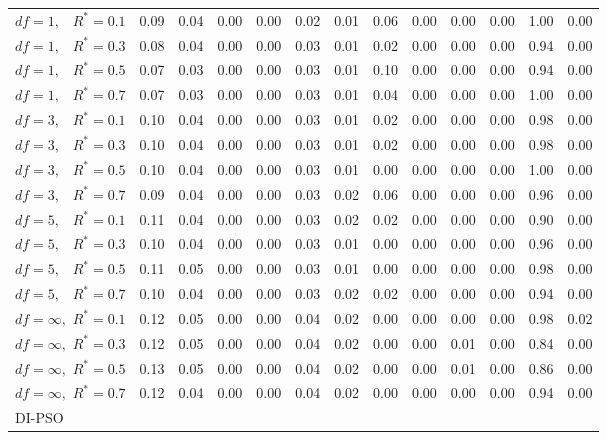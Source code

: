 \documentclass[12pt]{article}
\begin{document}
\begin{appendix}
\begin{table}[ht]
{\begin{tabular}{r|rrrr|rrrr|rrrr}
  $df = 1,\enspace$ $R^* =0.1$ & 0.09 & 0.04 & 0.00 & 0.00 & 0.02 & 0.01 & 0.06 & 0.00 & 0.00 & 0.00 & 1.00 & 0.00 \\ 
  $df = 1,\enspace$ $R^* =0.3$ & 0.08 & 0.04 & 0.00 & 0.00 & 0.03 & 0.01 & 0.02 & 0.00 & 0.00 & 0.00 & 0.94 & 0.00 \\ 
  $df = 1,\enspace$ $R^* =0.5$ & 0.07 & 0.03 & 0.00 & 0.00 & 0.03 & 0.01 & 0.10 & 0.00 & 0.00 & 0.00 & 0.94 & 0.00 \\ 
  $df = 1,\enspace$ $R^* =0.7$ & 0.07 & 0.03 & 0.00 & 0.00 & 0.03 & 0.01 & 0.04 & 0.00 & 0.00 & 0.00 & 1.00 & 0.00 \\ 
  $df = 3,\enspace$ $R^* =0.1$ & 0.10 & 0.04 & 0.00 & 0.00 & 0.03 & 0.01 & 0.02 & 0.00 & 0.00 & 0.00 & 0.98 & 0.00 \\ 
  $df = 3,\enspace$ $R^* =0.3$ & 0.10 & 0.04 & 0.00 & 0.00 & 0.03 & 0.01 & 0.02 & 0.00 & 0.00 & 0.00 & 0.98 & 0.00 \\ 
  $df = 3,\enspace$ $R^* =0.5$ & 0.10 & 0.04 & 0.00 & 0.00 & 0.03 & 0.01 & 0.00 & 0.00 & 0.00 & 0.00 & 1.00 & 0.00 \\ 
  $df = 3,\enspace$ $R^* =0.7$ & 0.09 & 0.04 & 0.00 & 0.00 & 0.03 & 0.02 & 0.06 & 0.00 & 0.00 & 0.00 & 0.96 & 0.00 \\ 
  $df = 5,\enspace$ $R^* =0.1$ & 0.11 & 0.04 & 0.00 & 0.00 & 0.03 & 0.02 & 0.02 & 0.00 & 0.00 & 0.00 & 0.90 & 0.00 \\ 
  $df = 5,\enspace$ $R^* =0.3$ & 0.10 & 0.04 & 0.00 & 0.00 & 0.03 & 0.01 & 0.00 & 0.00 & 0.00 & 0.00 & 0.96 & 0.00 \\ 
  $df = 5,\enspace$ $R^* =0.5$ & 0.11 & 0.05 & 0.00 & 0.00 & 0.03 & 0.01 & 0.00 & 0.00 & 0.00 & 0.00 & 0.98 & 0.00 \\ 
  $df = 5,\enspace$ $R^* =0.7$ & 0.10 & 0.04 & 0.00 & 0.00 & 0.03 & 0.02 & 0.02 & 0.00 & 0.00 & 0.00 & 0.94 & 0.00 \\ 
  $df = \infty,$ $R^* =0.1$ & 0.12 & 0.05 & 0.00 & 0.00 & 0.04 & 0.02 & 0.00 & 0.00 & 0.00 & 0.00 & 0.98 & 0.02 \\ 
  $df = \infty,$ $R^* =0.3$ & 0.12 & 0.05 & 0.00 & 0.00 & 0.04 & 0.02 & 0.00 & 0.00 & 0.01 & 0.00 & 0.84 & 0.00 \\ 
  $df = \infty,$ $R^* =0.5$ & 0.13 & 0.05 & 0.00 & 0.00 & 0.04 & 0.02 & 0.00 & 0.00 & 0.01 & 0.00 & 0.86 & 0.00 \\ 
  $df = \infty,$ $R^* =0.7$ & 0.12 & 0.04 & 0.00 & 0.00 & 0.04 & 0.02 & 0.00 & 0.00 & 0.00 & 0.00 & 0.94 & 0.00 \\ 
\hline
\multicolumn{1}{l|}{DI-PSO} &&&&&&&&&&&&\\

\end{tabular}}
\end{table}
\end{appendix}
\end{document}
